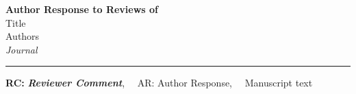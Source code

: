 \providecommand{\lettertitle}{Author Response to Reviews of}
\providecommand{\papertitle}{Title}
\providecommand{\authors}{Authors}
\providecommand{\journal}{Journal}
\providecommand{\doi}{--}





{\Large\bf \lettertitle}\\[1em]
{\huge \papertitle}\\[1em]
{\authors}\\
{\it \journal }\\
\hrule

\hfill {\bfseries \color{gray}RC:} \textbf{\color{gray}\textit{Reviewer Comment}},\(\quad\) AR: Author Response,\(\quad\) \vrule width 3pt \hspace{5pt} {\selectfont Manuscript text}

\renewcommand\thefigure{R\arabic{figure}}
\renewcommand{\theequation}{R\arabic{equation}}
\renewcommand{\thetable}{R\arabic{table}} 
\renewcommand\thelstlisting{R\arabic{lstlisting}}
\renewcommand\thesubsection{Q\arabic{section}.\arabic{subsection}}